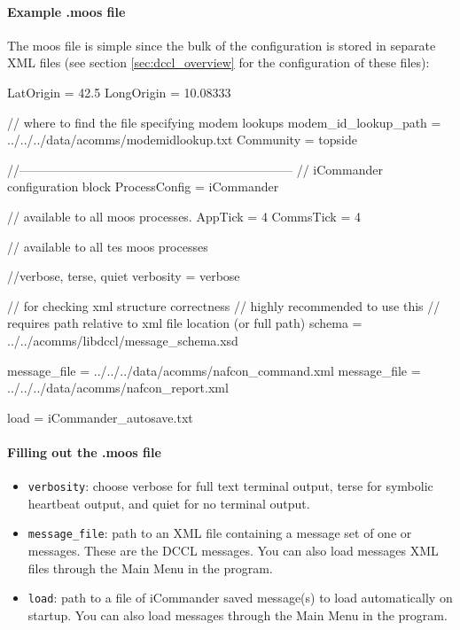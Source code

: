 \documentclass[11pt, letterpaper, oneside]{memoir}
\begin{document}
\begin{itemize}
\paragraph{Example .moos file}
The moos file is simple since the bulk of the configuration is stored in separate XML files (see section \ref{sec:dccl_overview} for the configuration of these files):

\begin{small}\begin{boxedverbatim}
LatOrigin = 42.5
LongOrigin = 10.08333

// where to find the file specifying modem lookups
modem_id_lookup_path = ../../../data/acomms/modemidlookup.txt
Community = topside

//------------------------------------------------------------------
// iCommander configuration  block 
ProcessConfig = iCommander
{
  // available to all moos processes.
  AppTick    = 4
  CommsTick  = 4
  
  // available to all tes moos processes

  //verbose, terse, quiet
  verbosity = verbose

  // for checking xml structure correctness
  // highly recommended to use this
  // requires path relative to xml file location (or full path)
  schema = ../../acomms/libdccl/message_schema.xsd

  message_file = ../../../data/acomms/nafcon_command.xml
  message_file = ../../../data/acomms/nafcon_report.xml

  load = iCommander_autosave.txt  
}
\end{boxedverbatim}
\resetbvlinenumber
\end{small}

\paragraph{Filling out the .moos file}
\begin{itemize}
\item \verb|verbosity|: choose verbose for full text terminal output, terse for symbolic heartbeat output, and quiet for no terminal output.
\item \verb|message_file|: path to an XML file containing a message set of one or messages. These are the DCCL messages. You can also load messages XML files through the Main Menu in the program.
\item \verb|load|: path to a file of iCommander saved message(s) to load automatically on startup. You can also load messages through the Main Menu in the program.
\end{itemize}


\end{itemize}
\end{document}
